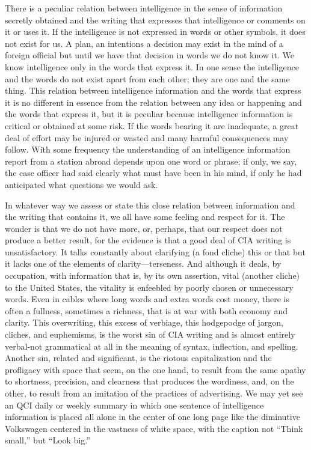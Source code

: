 \documentclass[
    oneside,
    11pt,
    draft
]{memoir}
\begin{document}
There is a peculiar relation between intelligence in the sense of information secretly obtained and the writing that expresses that intelligence or comments on it or uses it. If the intelligence is not expressed in words or other symbols, it does not exist for us. A plan, an intentions a decision may exist in the mind of a foreign official but until we have that decision in words we do not know it. We know intelligence only in the words that express it. In one sense the intelligence and the words do not exist apart from each other; they are one and the same thing. This relation between intelligence information and the words that express it is no different in essence from the relation between any idea or happening and the words that express it, but it is peculiar because intelligence information is critical or obtained at some risk. If the words bearing it are inadequate, a great deal of effort may be injured or wasted and many harmful consequences may follow. With some frequency the understanding of an intelligence information report from a station abroad depends upon one word or phrase; if only, we say, the case officer had said clearly what must have been in his mind, if only he had anticipated what questions we would ask.

In whatever way we assess or state this close relation between information and the writing that contains it, we all have some feeling and respect for it. The wonder is that we do not have more, or, perhaps, that our respect does not produce a better result, for the evidence is that a good deal of CIA writing is unsatisfactory. It talks constantly about clarifying (a fond cliche) this or that but it lacks one of the elements of clarity---terseness. And although it deals, by occupation, with information that is, by its own assertion, vital (another cliche) to the United States, the vitality is enfeebled by poorly chosen or unnecessary words. Even in cables where long words and extra words cost money, there is often a fullness, sometimes a richness, that is at war with both economy and clarity. This overwriting, this excess of verbiage, this hodgepodge of jargon, cliches, and euphemisms, is the worst sin of CIA writing and is almost entirely verbal-not grammatical at all in the meaning of syntax, inflection, and spelling. Another sin, related and significant, is the riotous capitalization and the profligacy with space that seem, on the one hand, to result from the same apathy to shortness, precision, and clearness that produces the wordiness, and, on the other, to result from an imitation of the practices of advertising. We may yet see an QCI daily or weekly summary in which one sentence of intelligence information is placed all alone in the center of one long page like the diminutive Volkswagen centered in the vastness of white space, with the caption not \enquote{Think small,} but \enquote{Look big.}
\end{document}
